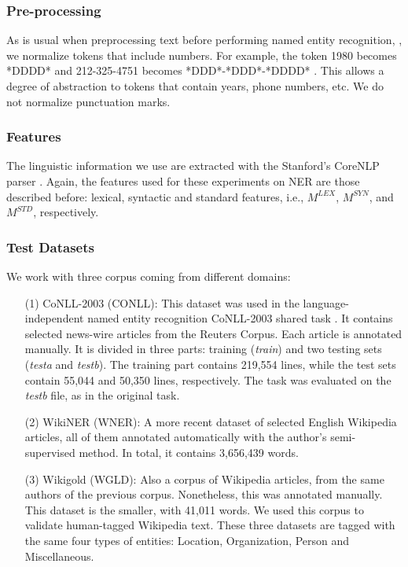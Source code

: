\subsubsection{Pre-processing}

As is usual when preprocessing text before performing named entity recognition, \cite{RatinovR09}, we normalize tokens that include numbers. For example, the token 1980 becomes *DDDD* and 212-325-4751 becomes *DDD*-*DDD*-*DDDD* . This allows a degree of abstraction to tokens that contain years, phone numbers, etc. We do not normalize punctuation marks.

\subsubsection{Features}
The linguistic information we use are extracted with the Stanford's CoreNLP parser \cite{manning2014}. Again, the features used for these experiments on NER are those described before: lexical, syntactic and standard features, i.e., $M^{LEX}$, $M^{SYN}$, and $M^{STD}$, respectively. 

\subsubsection{Test Datasets}We work with three corpus coming from different domains:
\begin{itemize}
\item [(1)] CoNLL-2003 (CONLL): This dataset was used in the language-independent named entity recognition CoNLL-2003 shared task \cite{SangM03}. It contains selected news-wire articles from the Reuters Corpus. Each article is annotated manually. It is divided in three parts:  training (\textit{train}) and two testing sets (\textit{testa} and \textit{testb}). The training part contains 219,554 lines, while the test sets contain 55,044 and 50,350 lines, respectively. The task was evaluated on the \textit{testb} file, as in the original task.
\item [(2)]WikiNER (WNER): A more recent dataset \cite{Balasuriya2009} of selected English \allowbreak Wikipedia articles, all of them annotated automatically with the author's semi-supervised \allowbreak method. In total, it contains 3,656,439 words. 
\item[(3)] Wikigold (WGLD): Also a corpus of Wikipedia articles, from the same authors of the previous corpus. Nonetheless, this was annotated manually. This dataset is the smaller, with 41,011 words. We used this corpus to validate human-tagged Wikipedia text. These three datasets are tagged with the same four types of entities: Location, Organization, Person and Miscellaneous.


\end{itemize}
%
